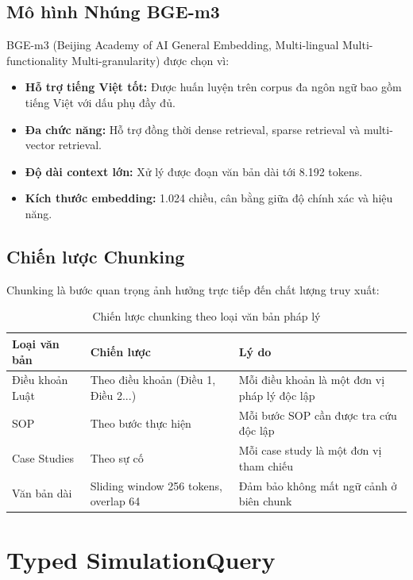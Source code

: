 \subsection{Mô hình Nhúng BGE-m3}

BGE-m3 \cite{chen2023bge} (Beijing Academy of AI General Embedding, Multi-lingual Multi-functionality Multi-granularity) được chọn vì:

\begin{itemize}[itemsep=4pt]
  \item \textbf{Hỗ trợ tiếng Việt tốt:} Được huấn luyện trên corpus đa ngôn ngữ bao gồm tiếng Việt với dấu phụ đầy đủ.
  \item \textbf{Đa chức năng:} Hỗ trợ đồng thời dense retrieval, sparse retrieval và multi-vector retrieval.
  \item \textbf{Độ dài context lớn:} Xử lý được đoạn văn bản dài tới 8.192 tokens.
  \item \textbf{Kích thước embedding:} 1.024 chiều, cân bằng giữa độ chính xác và hiệu năng.
\end{itemize}

\subsection{Chiến lược Chunking}

Chunking là bước quan trọng ảnh hưởng trực tiếp đến chất lượng truy xuất:

\begin{table}[H]
\centering
\caption{Chiến lược chunking theo loại văn bản pháp lý}
\label{tab:chunking}
\renewcommand{\arraystretch}{1.4}
\begin{tabular}{p{3cm} p{3cm} p{6cm}}
\toprule
\textbf{Loại văn bản} & \textbf{Chiến lược} & \textbf{Lý do} \\
\midrule
Điều khoản Luật & Theo điều khoản (Điều 1, Điều 2...) & Mỗi điều khoản là một đơn vị pháp lý độc lập \\
\rowcolor{rowgray}
SOP & Theo bước thực hiện & Mỗi bước SOP cần được tra cứu độc lập \\
Case Studies & Theo sự cố & Mỗi case study là một đơn vị tham chiếu \\
\rowcolor{rowgray}
Văn bản dài & Sliding window 256 tokens, overlap 64 & Đảm bảo không mất ngữ cảnh ở biên chunk \\
\bottomrule
\end{tabular}
\end{table}

\section{Typed SimulationQuery}

